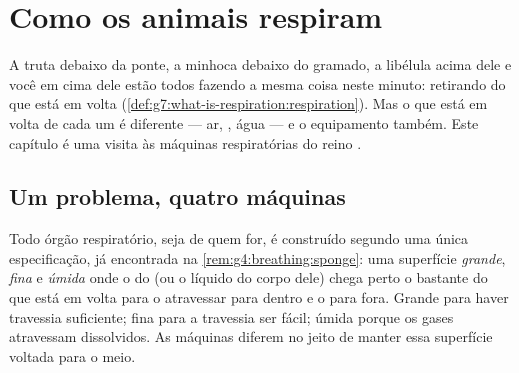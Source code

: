 \chapter{Como os animais respiram}\label{ch:g7:how-animals-breathe}

A truta debaixo da ponte, a minhoca debaixo do gramado, a libélula
acima dele e você em cima dele estão todos fazendo a mesma coisa neste
minuto: retirando  do que está em volta
(\cref{def:g7:what-is-respiration:respiration}). Mas o que está em
volta de cada um é diferente --- ar, , água --- e o equipamento
também. Este capítulo é uma visita às máquinas respiratórias do reino
.

\section{Um problema, quatro máquinas}

\begin{proposition}\label{prop:g7:how-animals-breathe:spec}
Todo órgão respiratório, seja de quem for, é construído segundo uma
única especificação, já encontrada na
\cref{rem:g4:breathing:sponge}: uma superfície \emph{grande},
\emph{fina} e \emph{úmida} onde o  do  (ou o líquido do
corpo dele) chega perto o bastante do que está em volta para o
 atravessar para dentro e o  para fora. Grande
para haver travessia suficiente; fina para a travessia ser fácil;
úmida porque os gases atravessam dissolvidos. As máquinas diferem no
jeito de manter essa superfície voltada para o meio.
\end{proposition}
\admitted

